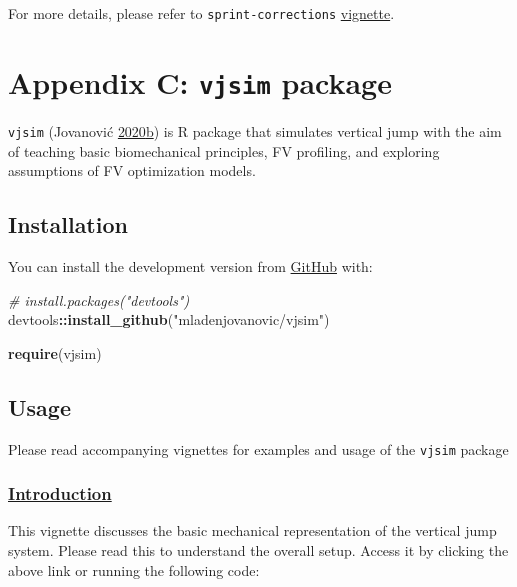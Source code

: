 \documentclass[
]{book}
\newenvironment{Shaded}{\begin{snugshade}}{\end{snugshade}}
\newcommand{\CommentTok}[1]{\textcolor[rgb]{0.56,0.35,0.01}{\textit{#1}}}
\newcommand{\KeywordTok}[1]{\textcolor[rgb]{0.13,0.29,0.53}{\textbf{#1}}}
\newcommand{\NormalTok}[1]{#1}
\newcommand{\OperatorTok}[1]{\textcolor[rgb]{0.81,0.36,0.00}{\textbf{#1}}}
\newcommand{\StringTok}[1]{\textcolor[rgb]{0.31,0.60,0.02}{#1}}
\begin{document}
For more details, please refer to \texttt{sprint-corrections} \href{https://mladenjovanovic.github.io/shorts/articles/sprint-corrections.html}{vignette}.

\hypertarget{appendix-c-vjsim-package}{%
\chapter{\texorpdfstring{Appendix C: \texttt{vjsim} package}{Appendix C: vjsim package}}\label{appendix-c-vjsim-package}}

\texttt{vjsim} (Jovanović \protect\hyperlink{ref-R-vjsim}{2020}\protect\hyperlink{ref-R-vjsim}{b}) is R package that simulates vertical jump with the aim of teaching basic biomechanical principles, FV profiling, and exploring assumptions of FV optimization models.

\hypertarget{installation}{%
\section{Installation}\label{installation}}

You can install the development version from \href{https://github.com/mladenjovanovic/vjsim}{GitHub} with:

\begin{Shaded}
\begin{Highlighting}[]
\CommentTok{\# install.packages("devtools")}
\NormalTok{devtools}\OperatorTok{::}\KeywordTok{install\_github}\NormalTok{(}\StringTok{"mladenjovanovic/vjsim"}\NormalTok{)}

\KeywordTok{require}\NormalTok{(vjsim)}
\end{Highlighting}
\end{Shaded}

\hypertarget{usage}{%
\section{Usage}\label{usage}}

Please read accompanying vignettes for examples and usage of the \texttt{vjsim} package

\hypertarget{introduction}{%
\subsection{\texorpdfstring{\href{https://mladenjovanovic.github.io/vjsim/articles/introduction-vjsim.html}{Introduction}}{Introduction}}\label{introduction}}

This vignette discusses the basic mechanical representation of the vertical jump system. Please read this to understand the overall setup. Access it by clicking the above link or running the following code:
\end{document}
